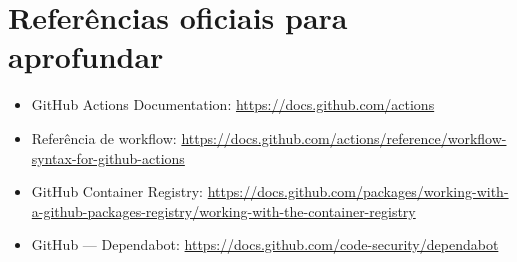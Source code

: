 \section{Referências oficiais para aprofundar}

\begin{itemize}[leftmargin=*, itemsep=0.3em]
  \item GitHub Actions Documentation: \url{https://docs.github.com/actions}
  \item Referência de workflow: \url{https://docs.github.com/actions/reference/workflow-syntax-for-github-actions}
  \item GitHub Container Registry: \url{https://docs.github.com/packages/working-with-a-github-packages-registry/working-with-the-container-registry}
  \item GitHub — Dependabot: \url{https://docs.github.com/code-security/dependabot}
\end{itemize}
